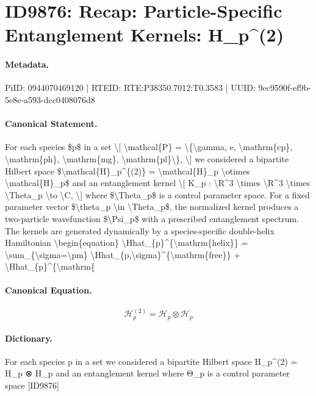 \section*{ID9876: Recap: Particle-Specific Entanglement Kernels: H\_p\textasciicircum{}(2)}
\paragraph{Metadata.}
PiID: 0944070469120 | RTEID: RTE:P38350.7012:T0.3583 | UUID: 9ec9590f-ef9b-5e8e-a593-dcc0408076d8

\paragraph{Canonical Statement.}
For each species \$p\$ in a set \textbackslash{}[ \textbackslash{}mathcal\{P\} = \textbackslash{}\{\textbackslash{}gamma, e, \textbackslash{}mathrm\{cp\}, \textbackslash{}mathrm\{ph\}, \textbackslash{}mathrm\{mg\}, \textbackslash{}mathrm\{pl\}\textbackslash{}\}, \textbackslash{}] we considered a bipartite Hilbert space \$\textbackslash{}mathcal\{H\}\_p\textasciicircum{}\{(2)\} = \textbackslash{}mathcal\{H\}\_p \textbackslash{}otimes \textbackslash{}mathcal\{H\}\_p\$ and an entanglement kernel \textbackslash{}[ K\_p : \textbackslash{}R\textasciicircum{}3 \textbackslash{}times \textbackslash{}R\textasciicircum{}3 \textbackslash{}times \textbackslash{}Theta\_p \textbackslash{}to \textbackslash{}C, \textbackslash{}] where \$\textbackslash{}Theta\_p\$ is a control parameter space. For a fixed parameter vector \$\textbackslash{}theta\_p \textbackslash{}in \textbackslash{}Theta\_p\$, the normalized kernel produces a two-particle wavefunction \$\textbackslash{}Psi\_p\$ with a prescribed entanglement spectrum. The kernels are generated dynamically by a species-specific double-helix Hamiltonian \textbackslash{}begin\{equation\} \textbackslash{}Hhat\_\{p\}\textasciicircum{}\{\textbackslash{}mathrm\{helix\}\} = \textbackslash{}sum\_\{\textbackslash{}sigma=\textbackslash{}pm\} \textbackslash{}Hhat\_\{p,\textbackslash{}sigma\}\textasciicircum{}\{\textbackslash{}mathrm\{free\}\} + \textbackslash{}Hhat\_\{p\}\textasciicircum{}\{\textbackslash{}mathrm\{

\paragraph{Canonical Equation.}
\[
\mathcal{H}_p^{(2)} = \mathcal{H}_p \otimes \mathcal{H}_p
\]

\paragraph{Dictionary.}
For each species p in a set we considered a bipartite Hilbert space H\_p\textasciicircum{}(2) = H\_p ⊗ H\_p and an entanglement kernel where Θ\_p is a control parameter space [ID9876]

